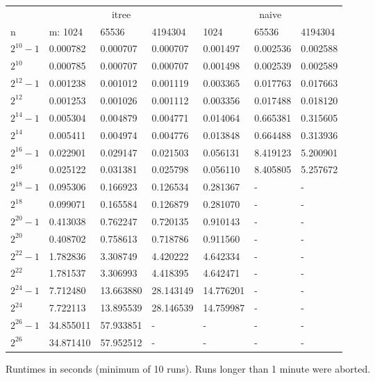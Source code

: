 \documentclass[a4paper,10pt]{article}
\begin{document}
\vspace{3mm}

\begin{figure}
\begin{tabular}{lllllll}
\toprule
  & \multicolumn{3}{c}{itree} & \multicolumn{3}{c}{naive} \\
\cmidrule(r){2-4} \cmidrule(r){5-7}
n & m: 1024 & 65536 & 4194304 & 1024 & 65536 & 4194304 \\
\midrule
$2^{10} - 1$ & 0.000782 & 0.000707 & 0.000707 & 0.001497 & 0.002536 & 0.002588 \\
$2^{10}$ & 0.000785 & 0.000707 & 0.000707 & 0.001498 & 0.002539 & 0.002589 \\
$2^{12} - 1$ & 0.001238 & 0.001012 & 0.001119 & 0.003365 & 0.017763 & 0.017663 \\
$2^{12}$ & 0.001253 & 0.001026 & 0.001112 & 0.003356 & 0.017488 & 0.018120 \\
$2^{14} - 1$ & 0.005304 & 0.004879 & 0.004771 & 0.014064 & 0.665381 & 0.315605 \\
$2^{14}$ & 0.005411 & 0.004974 & 0.004776 & 0.013848 & 0.664488 & 0.313936 \\
$2^{16} - 1$ & 0.022901 & 0.029147 & 0.021503 & 0.056131 & 8.419123 & 5.200901 \\
$2^{16}$ & 0.025122 & 0.031381 & 0.025798 & 0.056110 & 8.405805 & 5.257672 \\
$2^{18} - 1$ & 0.095306 & 0.166923 & 0.126534 & 0.281367 & - & - \\
$2^{18}$ & 0.099071 & 0.165584 & 0.126879 & 0.281070 & - & - \\
$2^{20} - 1$ & 0.413038 & 0.762247 & 0.720135 & 0.910143 & - & - \\
$2^{20}$ & 0.408702 & 0.758613 & 0.718786 & 0.911560 & - & - \\
$2^{22} - 1$ & 1.782836 & 3.308749 & 4.420222 & 4.642334 & - & - \\
$2^{22}$ & 1.781537 & 3.306993 & 4.418395 & 4.642471 & - & - \\
$2^{24} - 1$ & 7.712480 & 13.663880 & 28.143149 & 14.776201 & - & - \\
$2^{24}$ & 7.722113 & 13.895539 & 28.146539 & 14.759987 & - & - \\
$2^{26} - 1$ & 34.855011 & 57.933851 & - & - & - & - \\
$2^{26}$ & 34.871410 & 57.952512 & - & - & - & - \\
\bottomrule
\end{tabular}
\caption{Runtimes in seconds (minimum of 10 runs). Runs longer than 1 minute were aborted.}
\label{fig:resultstable}
\end{figure}
\end{document}
